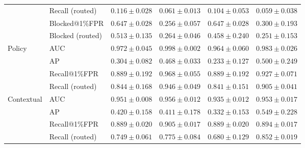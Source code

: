\begin{table}[t]
{\begin{tabular}{llcccc}
 & Recall (routed) & $0.116\pm0.028$ & $0.061\pm0.013$ & $0.104\pm0.053$ & $0.059\pm0.038$ \\
 & Blocked@1\%FPR & $0.647\pm0.028$ & $0.256\pm0.057$ & $0.647\pm0.028$ & $0.300\pm0.193$ \\
 & Blocked (routed) & $0.513\pm0.135$ & $0.264\pm0.046$ & $0.458\pm0.240$ & $0.251\pm0.153$ \\
\midrule
\multirow{4}{*}{Policy} & AUC & $0.972\pm0.045$ & $0.998\pm0.002$ & $0.964\pm0.060$ & $0.983\pm0.026$ \\
 & AP & $0.304\pm0.082$ & $0.468\pm0.033$ & $0.233\pm0.127$ & $0.500\pm0.249$ \\
 & Recall@1\%FPR & $0.889\pm0.192$ & $0.968\pm0.055$ & $0.889\pm0.192$ & $0.927\pm0.071$ \\
 & Recall (routed) & $0.844\pm0.168$ & $0.946\pm0.049$ & $0.841\pm0.151$ & $0.905\pm0.041$ \\
\midrule
\multirow{4}{*}{Contextual} & AUC & $0.951\pm0.008$ & $0.956\pm0.012$ & $0.935\pm0.012$ & $0.953\pm0.017$ \\
 & AP & $0.420\pm0.158$ & $0.411\pm0.178$ & $0.332\pm0.153$ & $0.549\pm0.228$ \\
 & Recall@1\%FPR & $0.889\pm0.020$ & $0.905\pm0.017$ & $0.889\pm0.020$ & $0.894\pm0.017$ \\
 & Recall (routed) & $0.749\pm0.061$ & $0.775\pm0.084$ & $0.680\pm0.129$ & $0.852\pm0.019$ \\
\bottomrule
\end{tabular}}
\end{table}
